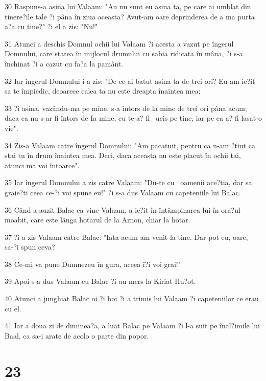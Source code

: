 \par 30 Raspuns-a asina lui Valaam: "Au nu sunt eu asina ta, pe care ai umblat din tinere?ile tale ?i pâna în ziua aceasta? Avut-am oare deprinderea de a ma purta a?a cu tine?" ?i el a zis: "Nu!"
\par 31 Atunci a deschis Domnul ochii lui Valaam ?i acesta a vazut pe îngerul Domnului, care statea în mijlocul drumului cu sabia ridicata în mâna, ?i s-a închinat ?i a cazut cu fa?a la pamânt.
\par 32 Iar îngerul Domnului i-a zis: "De ce ai batut asina ta de trei ori? Eu am ie?it sa te împiedic, deoarece calea ta nu este dreapta înaintea mea;
\par 33 ?i asina, vazându-ma pe mine, s-a întors de la mine de trei ori pâna acum; daca ea nu s-ar fi întors de Ia mine, eu te-a? fi  ucis pe tine, iar pe ea a? fi lasat-o vie".
\par 34 Zis-a Valaam catre îngerul Domnului: "Am pacatuit, pentru ca n-am ?tiut ca stai tu în drum înaintea mea. Deci, daca aceasta nu este placut în ochii tai, atunci ma voi întoarce".
\par 35 Iar îngerul Domnului a zis catre Valaam: "Du-te cu  oamenii ace?tia, dar sa graie?ti ceea ce-?i voi spune eu!" ?i s-a dus Valaam cu capeteniile lui Balac.
\par 36 Când a auzit Balac ca vine Valaam, a ie?it în întâmpinarea lui în ora?ul moabit, care este lânga hotarul de la Arnon, chiar la hotar.
\par 37 ?i a zis Valaam catre Balac: "Iata acum am venit la tine. Dar pot eu, oare, sa-?i spun ceva?
\par 38 Ce-mi va pune Dumnezeu în gura, aceea î?i voi grai!"
\par 39 Apoi s-a dus Valaam cu Balac ?i au mers la Kiriat-Hu?ot.
\par 40 Atunci a junghiat Balac oi ?i boi ?i a trimis lui Valaam ?i capeteniilor ce erau cu el.
\par 41 Iar a doua zi de diminea?a, a luat Balac pe Valaam ?i l-a suit pe înal?imile lui Baal, ca sa-i arate de acolo o parte din popor.

\chapter{23}

